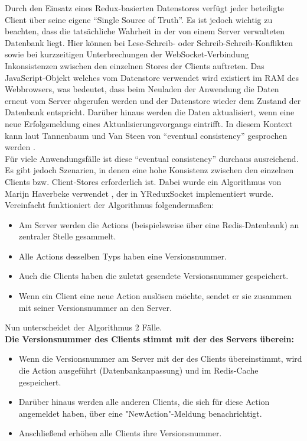 \documentclass[12pt]{book}          %
\begin{document}
Durch den Einsatz eines Redux-basierten Datenstores verfügt jeder beteiligte Client über seine eigene "`Single Source of Truth"'. Es ist jedoch wichtig zu beachten, dass die tatsächliche Wahrheit in der von einem Server verwalteten Datenbank liegt. Hier können bei Lese-Schreib- oder Schreib-Schreib-Konflikten sowie bei kurzzeitigen Unterbrechungen der WebSocket-Verbindung Inkonsistenzen zwischen den einzelnen Stores der Clients auftreten. Das JavaScript-Objekt welches vom Datenstore verwendet wird existiert im RAM des Webbrowsers, was bedeutet, dass beim Neuladen der Anwendung die Daten erneut vom Server abgerufen werden und der Datenstore wieder dem Zustand der Datenbank entspricht. Darüber hinaus werden die Daten aktualisiert, wenn eine neue Erfolgsmeldung eines Aktualisierungsvorgangs eintrifft. In diesem Kontext kann laut Tannenbaum und Van Steen von "`eventual consistency"' gesprochen werden \cite[319, 322]{tanenbaum_verteilte_2008}. \\ 

Für viele Anwendungsfälle ist diese "`eventual consistency"' durchaus ausreichend. Es gibt jedoch Szenarien, in denen eine hohe Konsistenz zwischen den einzelnen Clients bzw. Client-Stores erforderlich ist. Dabei wurde ein Algorithmus von Marijn Haverbeke verwendet \cite{haverbeke_collaborative_2015}, der in YReduxSocket implementiert wurde. Vereinfacht funktioniert der Algorithmus folgendermaßen:

\begin{itemize}
    \item Am Server werden die Actions (beispielsweise über eine Redis-Datenbank) an zentraler Stelle gesammelt.
    \item Alle Actions desselben Typs haben eine Versionsnummer.
    \item Auch die Clients haben die zuletzt gesendete Versionsnummer gespeichert.
    \item Wenn ein Client eine neue Action auslösen möchte, sendet er sie zusammen mit seiner Versionsnummer an den Server.
\end{itemize}

Nun unterscheidet der Algorithmus 2 Fälle. \\

\textbf{Die Versionsnummer des Clients stimmt mit der des Servers überein:}

\begin{itemize}
    \item Wenn die Versionsnummer am Server mit der des Clients übereinstimmt, wird die Action ausgeführt (Datenbankanpassung) und im Redis-Cache gespeichert.
    \item Darüber hinaus werden alle anderen Clients, die sich für diese Action angemeldet haben, über eine "NewAction"-Meldung benachrichtigt.
    \item Anschließend erhöhen alle Clients ihre Versionsnummer.
\end{itemize}
\end{document}
